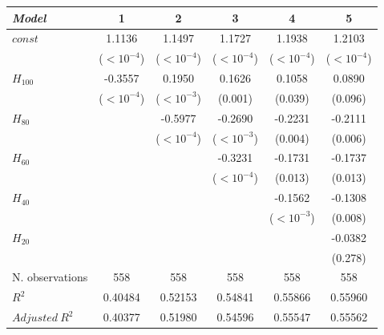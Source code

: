 \begin{tabular}{lccccc}
\toprule
\textit{Model} & 1 & 2 & 3 & 4 & 5 \\
\midrule
$\mathit{const}$ & 1.1136 & 1.1497 & 1.1727 & 1.1938 & 1.2103 \\
 & {\scriptsize ($<10^{-4}$)} & {\scriptsize ($<10^{-4}$)} & {\scriptsize ($<10^{-4}$)} & {\scriptsize ($<10^{-4}$)} & {\scriptsize ($<10^{-4}$)} \\
$H_{100}$ & -0.3557 & 0.1950 & 0.1626 & 0.1058 & 0.0890 \\
 & {\scriptsize ($<10^{-4}$)} & {\scriptsize ($<10^{-3}$)} & {\scriptsize (0.001)} & {\scriptsize (0.039)} & {\scriptsize (0.096)} \\
$H_{80}$ &  & -0.5977 & -0.2690 & -0.2231 & -0.2111 \\
 &  & {\scriptsize ($<10^{-4}$)} & {\scriptsize ($<10^{-3}$)} & {\scriptsize (0.004)} & {\scriptsize (0.006)} \\
$H_{60}$ &  &  & -0.3231 & -0.1731 & -0.1737 \\
 &  &  & {\scriptsize ($<10^{-4}$)} & {\scriptsize (0.013)} & {\scriptsize (0.013)} \\
$H_{40}$ &  &  &  & -0.1562 & -0.1308 \\
 &  &  &  & {\scriptsize ($<10^{-3}$)} & {\scriptsize (0.008)} \\
$H_{20}$ &  &  &  &  & -0.0382 \\
 &  &  &  &  & {\scriptsize (0.278)} \\
\midrule
N. observations & 558 & 558 & 558 & 558 & 558 \\
$R^2$ & 0.40484 & 0.52153 & 0.54841 & 0.55866 & 0.55960 \\
$\mathit{Adjusted}~R^2$ & 0.40377 & 0.51980 & 0.54596 & 0.55547 & 0.55562 \\
\bottomrule
\end{tabular}
